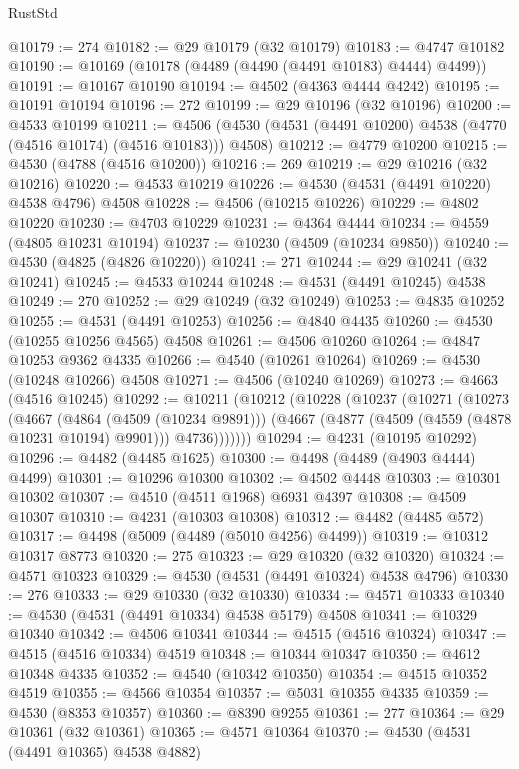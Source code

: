 \begin{lexlean}{RustStd}
\begin{coremodule}
{\begin{coremodule}
{{{{{{{{{{{{{{{{{{{{{{{{{{{{{{{{{{{{{{{{{{{{{{{{{{{{{{{@10179 := 274
@10182 := @29 @10179 (@32 @10179)
@10183 := @4747 @10182
@10190 := @10169 (@10178 (@4489 (@4490 (@4491 @10183) @4444) @4499))
@10191 := @10167 @10190
@10194 := @4502 (@4363 @4444 @4242)
@10195 := @10191 @10194
@10196 := 272
@10199 := @29 @10196 (@32 @10196)
@10200 := @4533 @10199
@10211 := @4506 (@4530 (@4531 (@4491 @10200) @4538 (@4770 (@4516 @10174) (@4516 @10183))) @4508)
@10212 := @4779 @10200
@10215 := @4530 (@4788 (@4516 @10200))
@10216 := 269
@10219 := @29 @10216 (@32 @10216)
@10220 := @4533 @10219
@10226 := @4530 (@4531 (@4491 @10220) @4538 @4796) @4508
@10228 := @4506 (@10215 @10226)
@10229 := @4802 @10220
@10230 := @4703 @10229
@10231 := @4364 @4444
@10234 := @4559 (@4805 @10231 @10194)
@10237 := @10230 (@4509 (@10234 @9850))
@10240 := @4530 (@4825 (@4826 @10220))
@10241 := 271
@10244 := @29 @10241 (@32 @10241)
@10245 := @4533 @10244
@10248 := @4531 (@4491 @10245) @4538
@10249 := 270
@10252 := @29 @10249 (@32 @10249)
@10253 := @4835 @10252
@10255 := @4531 (@4491 @10253)
@10256 := @4840 @4435
@10260 := @4530 (@10255 @10256 @4565) @4508
@10261 := @4506 @10260
@10264 := @4847 @10253 @9362 @4335
@10266 := @4540 (@10261 @10264)
@10269 := @4530 (@10248 @10266) @4508
@10271 := @4506 (@10240 @10269)
@10273 := @4663 (@4516 @10245)
@10292 := @10211
    (@10212
      (@10228
        (@10237
          (@10271
            (@10273
              (@4667
                (@4864 (@4509 (@10234 @9891)))
                (@4667 (@4877 (@4509 (@4559 (@4878 @10231 @10194) @9901))) @4736)))))))
@10294 := @4231 (@10195 @10292)
@10296 := @4482 (@4485 @1625)
@10300 := @4498 (@4489 (@4903 @4444) @4499)
@10301 := @10296 @10300
@10302 := @4502 @4448
@10303 := @10301 @10302
@10307 := @4510 (@4511 @1968) @6931 @4397
@10308 := @4509 @10307
@10310 := @4231 (@10303 @10308)
@10312 := @4482 (@4485 @572)
@10317 := @4498 (@5009 (@4489 (@5010 @4256) @4499))
@10319 := @10312 @10317 @8773
@10320 := 275
@10323 := @29 @10320 (@32 @10320)
@10324 := @4571 @10323
@10329 := @4530 (@4531 (@4491 @10324) @4538 @4796)
@10330 := 276
@10333 := @29 @10330 (@32 @10330)
@10334 := @4571 @10333
@10340 := @4530 (@4531 (@4491 @10334) @4538 @5179) @4508
@10341 := @10329 @10340
@10342 := @4506 @10341
@10344 := @4515 (@4516 @10324)
@10347 := @4515 (@4516 @10334) @4519
@10348 := @10344 @10347
@10350 := @4612 @10348 @4335
@10352 := @4540 (@10342 @10350)
@10354 := @4515 @10352 @4519
@10355 := @4566 @10354
@10357 := @5031 @10355 @4335
@10359 := @4530 (@8353 @10357)
@10360 := @8390 @9255
@10361 := 277
@10364 := @29 @10361 (@32 @10361)
@10365 := @4571 @10364
@10370 := @4530 (@4531 (@4491 @10365) @4538 @4882)
}}}}}}}}}}}}}}}}}}}}}}}}}}}}}}}}}}}}}}}}}}}}}}}}}}}}}}}
\end{coremodule}}
\end{coremodule}
\end{lexlean}
